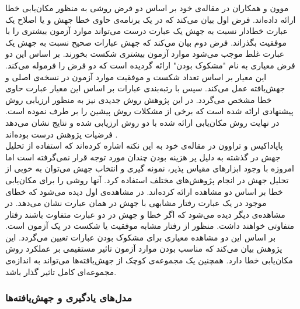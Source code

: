 موون و همکاران در مقاله‌ی خود بر اساس دو فرض روشی به منظور مکان‌یابی خطا ارائه داده‌اند. فرض اول بیان می‌کند که  در یک برنامه‌ی حاوی خطا جهش و یا اصلاح یک عبارت خطا‌دار نسبت به جهش یک عبارت درست می‌تواند موارد آزمون بیشتری را  با موفقیت بگذراند. فرض دوم  بیان می‌کند که جهش عبارات صحیح نسبت به جهش یک عبارت غلط موجب می‌شود موارد آزمون بیشتری شکست بخورند. بر اساس این دو فرض معیاری به نام "مشکوک بودن"  ارائه گردیده است که دو فرض را فرموله می‌کند. این معیار بر اساس تعداد شکست و موفقیت موارد آزمون در نسخه‌ی اصلی و جهش‌یافته عمل می‌کند. سپس با رتبه‌بندی عبارات بر اساس این معیار عبارت حاوی خطا مشخص می‌گردد. در این پژوهش روش جدیدی نیز به منظور ارزیابی روش پیشنهادی ارائه شده است که برخی از مشکلات روش پیشین را بر طرف نموده است. در نهایت روش مکان‌یابی ارائه شده با دو روش ارزیابی شده و نتایج نشان می‌دهد فرضیات پژوهش درست بوده‌اند \cite{moon2014ask}. \\

پاپاداکیس  و تراوون  در مقاله‌ی خود به این نکته اشاره کرده‌اند  که استفاده از تحلیل جهش در گذشته به دلیل پر هزینه بودن چندان مورد توجه قرار نمی‌گرفته است اما امروزه با وجود ابزارهای مقیاس پذیر، نمونه گیری و انتخاب جهش می‌توان به خوبی از تحلیل جهش در انجام پژوهش‌های مختلف استفاده کرد\cite{papadakis2015metallaxis}. آنها روشی را برای مکان‌یابی خطا بر اساس دو مشاهده ارائه کرده‌اند. در مشاهده‌ی اول دیده می‌شود که خطای موجود در یک عبارت رفتار مشابهی با جهش در همان عبارت نشان می‌دهد. در مشاهده‌ی دیگر دیده می‌شود که اگر  خطا و جهش در دو عبارت متفاوت باشند رفتار متفاوتی خواهند داشت. منظور از رفتار مشابه موفقیت یا شکست در یک آزمون است. بر اساس این دو مشاهده معیاری برای مشکوک بودن عبارات تعیین می‌گردد. این پژوهش بیان می‌کند که مناسب بودن موارد آزمون تاثیر مستقیمی بر عملکرد روش مکان‌یابی خطا  دارد. همچنین یک مجموعه‌ی کوچک از جهش‌یافته‌ها می‌تواند به اندازه‌ی مجموعه‌ای کامل تاثیر گذار باشد. \\

\subsubsection{مدل‌های یادگیری و جهش‌یافته‌ها}
 
